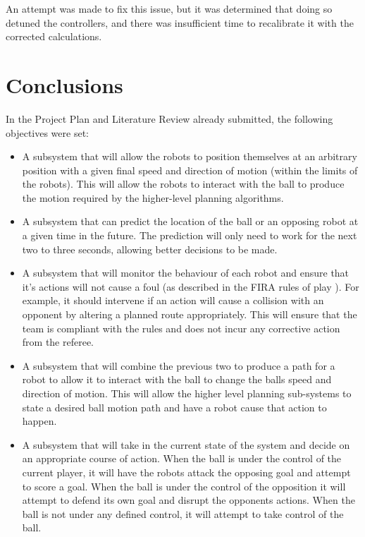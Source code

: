 \documentclass[10pt]{article}
\begin{document}
An attempt was made to fix this issue, but it was determined that doing so
detuned the controllers, and there was insufficient time to recalibrate it with
the corrected calculations.

\section{Conclusions}

In the Project Plan and Literature Review already submitted, the following
objectives were set:

\begin{itemize}
\item A subsystem that will allow the robots to position themselves at an 
arbitrary position with a given final speed and direction of motion (within the
limits of the robots).  This will allow the robots to interact with the ball to 
produce the motion required by the higher-level planning algorithms.

\item A subsystem that can predict the location of the ball or an opposing robot 
at a given time in the future.  The prediction will only need to work for the 
next two to three seconds, allowing better decisions to be made.

\item A subsystem that will monitor the behaviour of each robot and ensure that 
it's actions will not cause a foul (as described in the FIRA rules of play 
\cite{simurosotSim}).  For example, it should intervene if an action will cause 
a collision with an opponent by altering a planned route appropriately.  This 
will ensure that the team is compliant with the rules and does not incur any 
corrective action from the referee.

\item A subsystem that will combine the previous two to produce a path for a 
robot to allow it to interact with the ball to change the balls speed and 
direction of motion.  This will allow the higher level planning sub-systems 
to state a desired ball motion path and have a robot cause that action to 
happen.

\item A subsystem that will take in the current state of the system and decide 
on an appropriate course of action. When the ball is under the control of the 
current player, it will have the robots attack the opposing goal and attempt to 
score a goal.  When the ball is under the control of the opposition it will 
attempt to defend its own goal and disrupt the opponents actions. When the ball 
is not under any defined control, it will attempt to take control of the ball.
\end{itemize}
\end{document}
